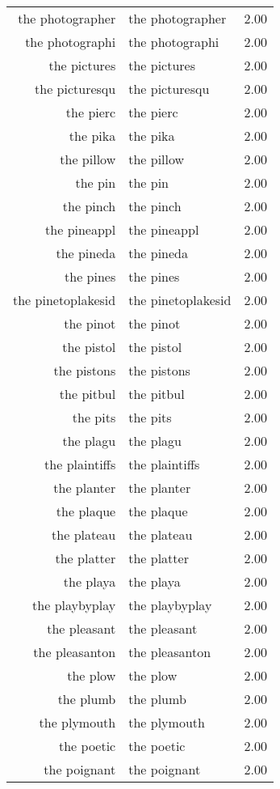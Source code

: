 \begin{table}[ht]
\begin{tabular}{rlr}
  the photographer & the photographer & 2.00 \\ 
  the photographi & the photographi & 2.00 \\ 
  the pictures & the pictures & 2.00 \\ 
  the picturesqu & the picturesqu & 2.00 \\ 
  the pierc & the pierc & 2.00 \\ 
  the pika & the pika & 2.00 \\ 
  the pillow & the pillow & 2.00 \\ 
  the pin & the pin & 2.00 \\ 
  the pinch & the pinch & 2.00 \\ 
  the pineappl & the pineappl & 2.00 \\ 
  the pineda & the pineda & 2.00 \\ 
  the pines & the pines & 2.00 \\ 
  the pinetoplakesid & the pinetoplakesid & 2.00 \\ 
  the pinot & the pinot & 2.00 \\ 
  the pistol & the pistol & 2.00 \\ 
  the pistons & the pistons & 2.00 \\ 
  the pitbul & the pitbul & 2.00 \\ 
  the pits & the pits & 2.00 \\ 
  the plagu & the plagu & 2.00 \\ 
  the plaintiffs & the plaintiffs & 2.00 \\ 
  the planter & the planter & 2.00 \\ 
  the plaque & the plaque & 2.00 \\ 
  the plateau & the plateau & 2.00 \\ 
  the platter & the platter & 2.00 \\ 
  the playa & the playa & 2.00 \\ 
  the playbyplay & the playbyplay & 2.00 \\ 
  the pleasant & the pleasant & 2.00 \\ 
  the pleasanton & the pleasanton & 2.00 \\ 
  the plow & the plow & 2.00 \\ 
  the plumb & the plumb & 2.00 \\ 
  the plymouth & the plymouth & 2.00 \\ 
  the poetic & the poetic & 2.00 \\ 
  the poignant & the poignant & 2.00 \\ 

\end{tabular}
\end{table}
